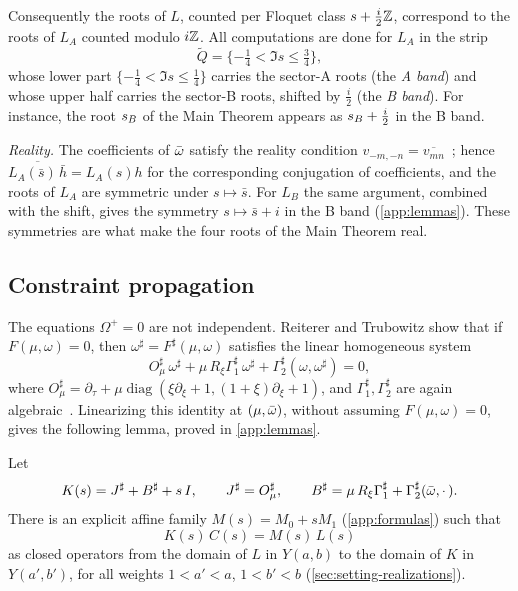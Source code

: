 Consequently the roots of $L$, counted per Floquet class $s+\tfrac{i}{2}\mathbb{Z}$, correspond to the roots of
$L_A$ counted modulo $i\mathbb{Z}$. All computations are done for $L_A$ in the strip
\[
  \widetilde Q=\{-\tfrac14<\Im s\le\tfrac34\},
\]
whose lower part $\{-\tfrac14<\Im s\le\tfrac14\}$ carries the sector-A roots (the \emph{A band}) and whose upper
half carries the sector-B roots, shifted by $\tfrac i2$ (the \emph{B band}). For instance, the root $s_{B}$
of the Main Theorem appears as $s_{B}+\tfrac i2$ in the B band.

\emph{Reality.} The coefficients of $\bar\omega$ satisfy the reality condition
$v_{-m,-n}=\overline{v_{mn}}$~\cite{RT2019}; hence $\overline{L_A(\bar s)\,\bar h}=L_A(s)h$ for the
corresponding conjugation of coefficients, and the roots of $L_A$ are symmetric under $s\mapsto\bar s$.
For $L_B$ the same argument, combined with the shift, gives the symmetry $s\mapsto\bar s+i$ in the B band
(\cref{app:lemmas}). These symmetries are what make the four roots of the Main Theorem real.

\subsection{Constraint propagation}\label{sec:setting-constraints}

The equations $\Omega^+=0$ are not independent. Reiterer and Trubowitz show that if $F(\mu,\omega)=0$,
then $\omega^\sharp=F^\sharp(\mu,\omega)$ satisfies the linear homogeneous system
\begin{equation}\label{eq:sharp}
  O_\mu^\sharp\,\omega^\sharp+\mu\,R_\xi\Gamma_1^\sharp\,\omega^\sharp+\Gamma_2^\sharp(\omega,\omega^\sharp)=0,
\end{equation}
where $O_\mu^\sharp=\partial_\tau+\mu\operatorname{diag}(\xi\partial_\xi+1,(1+\xi)\partial_\xi+1)$, and
$\Gamma^\sharp_1,\Gamma^\sharp_2$ are again algebraic~\cite[\S3]{RT2019}. Linearizing this identity at
$(\mu,\bar\omega)$, without assuming $F(\mu,\omega)=0$, gives the following lemma, proved in
\cref{app:lemmas}.

\begin{lemma}\label{lem:KCML}
Let
\[
  K(s)=J^\sharp+B^\sharp+s\,I,\qquad J^\sharp=O^\sharp_\mu,\qquad
  B^\sharp=\mu\,R_\xi\Gamma_1^\sharp+\Gamma_2^\sharp(\bar\omega,\cdot\,).
\]
There is an explicit affine family $M(s)=M_0+sM_1$ (\cref{app:formulas}) such that
\begin{equation}\label{eq:KCML}
  K(s)\,C(s)=M(s)\,L(s)
\end{equation}
as closed operators from the domain of $L$ in $Y(a,b)$ to the domain of $K$ in $Y(a',b')$, for all weights
$1<a'<a$, $1<b'<b$ (\cref{sec:setting-realizations}).
\end{lemma}

